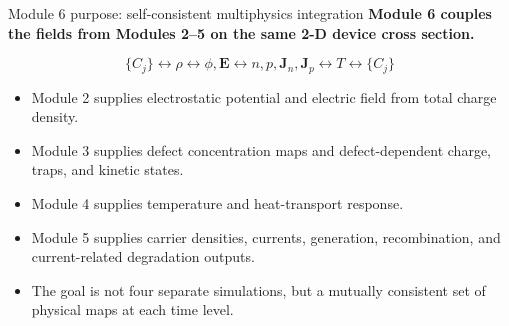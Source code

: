 \documentclass[aspectratio=169,10pt]{beamer}
\begin{document}
\begin{frame}{Module 6 purpose: self-consistent multiphysics integration}
\small
\textbf{Module 6 couples the fields from Modules 2--5 on the same 2-D device cross section.}

\vspace{0.2em}
\begin{equation*}
\boxed{
\{C_j\}\leftrightarrow \rho\leftrightarrow \phi,\mathbf E
\leftrightarrow n,p,\mathbf J_n,\mathbf J_p
\leftrightarrow T
\leftrightarrow \{C_j\}
}
\end{equation*}

\vspace{-0.1em}
\begin{itemize}
    \item Module 2 supplies electrostatic potential and electric field from total charge density.
    \item Module 3 supplies defect concentration maps and defect-dependent charge, traps, and kinetic states.
    \item Module 4 supplies temperature and heat-transport response.
    \item Module 5 supplies carrier densities, currents, generation, recombination, and current-related degradation outputs.
    \item The goal is not four separate simulations, but a mutually consistent set of physical maps at each time level.
\end{itemize}
\end{frame}
\end{document}
